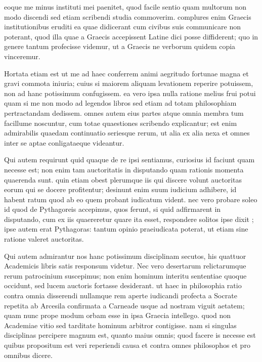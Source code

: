  eoque me minus instituti mei paenitet, quod facile sentio quam multorum non modo discendi sed etiam scribendi studia commoverim. complures enim Graecis institutionibus eruditi ea quae didicerant cum civibus suis communicare non poterant, quod illa quae a Graecis accepissent Latine dici posse diffiderent; quo in genere tantum profecisse videmur, ut a Graecis ne verborum quidem copia vinceremur.

 Hortata etiam est ut me ad haec conferrem animi aegritudo fortunae magna et gravi commota iniuria; cuius si maiorem aliquam levationem reperire potuissem, non ad hanc potissimum confugissem. ea vero ipsa nulla ratione melius frui potui quam si me non modo ad legendos libros sed etiam ad totam philosophiam pertractandam dedissem. omnes autem eius partes atque omnia membra tum facillume noscuntur, cum totae quaestiones scribendo explicantur; est enim admirabilis quaedam continuatio seriesque rerum, ut alia ex alia nexa et omnes inter se aptae conligataeque videantur.

 Qui autem requirunt quid quaque de re ipsi sentiamus, curiosius id faciunt quam necesse est; non enim tam auctoritatis in disputando quam rationis momenta quaerenda sunt. quin etiam obest plerumque iis qui discere volunt auctoritas eorum qui se docere profitentur; desinunt enim suum iudicium adhibere, id habent ratum quod ab eo quem probant iudicatum vident. nec vero probare soleo id quod de Pythagoreis accepimus, quos ferunt, si quid adfirmarent in disputando, cum ex iis quaereretur quare ita esset, respondere solitos ipse dixit ; ipse autem erat Pythagoras: tantum opinio praeiudicata poterat, ut etiam sine ratione valeret auctoritas.

 Qui autem admirantur nos hanc potissimum disciplinam secutos, his quattuor Academicis libris satis responsum videtur. Nec vero desertarum relictarumque rerum patrocinium suscepimus; non enim hominum interitu sententiae quoque occidunt, sed lucem auctoris fortasse desiderant. ut haec in philosophia ratio contra omnia disserendi nullamque rem aperte iudicandi profecta a Socrate repetita ab Arcesila confirmata a Carneade usque ad nostram viguit aetatem; quam nunc prope modum orbam esse in ipsa Graecia intellego. quod non Academiae vitio sed tarditate hominum arbitror contigisse. nam si singulas disciplinas percipere magnum est, quanto maius omnis; quod facere is necesse est quibus propositum est veri reperiendi causa et contra omnes philosophos et pro omnibus dicere.

